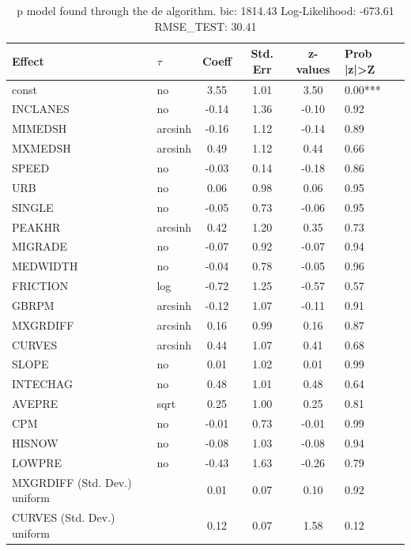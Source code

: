 \begin{table}
	\caption{p model found through the de algorithm. bic: 1814.43 Log-Likelihood: -673.61 RMSE_TEST: 30.41}
	\begin{center}
		\begin{tabular}{|l|l|c|c|c|l|}
			\hline
			Effect & $\tau$ & Coeff & Std. Err & z-values & Prob |z|>Z \\
			\hline
			const & no & 3.55 & 1.01 & 3.50 & 0.00*** \\
			\hline
			INCLANES & no & -0.14 & 1.36 & -0.10 & 0.92 \\
			\hline
			MIMEDSH & arcsinh & -0.16 & 1.12 & -0.14 & 0.89 \\
			\hline
			MXMEDSH & arcsinh & 0.49 & 1.12 & 0.44 & 0.66 \\
			\hline
			SPEED & no & -0.03 & 0.14 & -0.18 & 0.86 \\
			\hline
			URB & no & 0.06 & 0.98 & 0.06 & 0.95 \\
			\hline
			SINGLE & no & -0.05 & 0.73 & -0.06 & 0.95 \\
			\hline
			PEAKHR & arcsinh & 0.42 & 1.20 & 0.35 & 0.73 \\
			\hline
			MIGRADE & no & -0.07 & 0.92 & -0.07 & 0.94 \\
			\hline
			MEDWIDTH & no & -0.04 & 0.78 & -0.05 & 0.96 \\
			\hline
			FRICTION & log & -0.72 & 1.25 & -0.57 & 0.57 \\
			\hline
			GBRPM & arcsinh & -0.12 & 1.07 & -0.11 & 0.91 \\
			\hline
			MXGRDIFF & arcsinh & 0.16 & 0.99 & 0.16 & 0.87 \\
			\hline
			CURVES & arcsinh & 0.44 & 1.07 & 0.41 & 0.68 \\
			\hline
			SLOPE & no & 0.01 & 1.02 & 0.01 & 0.99 \\
			\hline
			INTECHAG & no & 0.48 & 1.01 & 0.48 & 0.64 \\
			\hline
			AVEPRE & sqrt & 0.25 & 1.00 & 0.25 & 0.81 \\
			\hline
			CPM & no & -0.01 & 0.73 & -0.01 & 0.99 \\
			\hline
			HISNOW & no & -0.08 & 1.03 & -0.08 & 0.94 \\
			\hline
			LOWPRE & no & -0.43 & 1.63 & -0.26 & 0.79 \\
			\hline
			MXGRDIFF (Std. Dev.) uniform &  & 0.01 & 0.07 & 0.10 & 0.92 \\
			\hline
			CURVES (Std. Dev.) uniform &  & 0.12 & 0.07 & 1.58 & 0.12 \\

\end{tabular}
\end{center}
\end{table}
